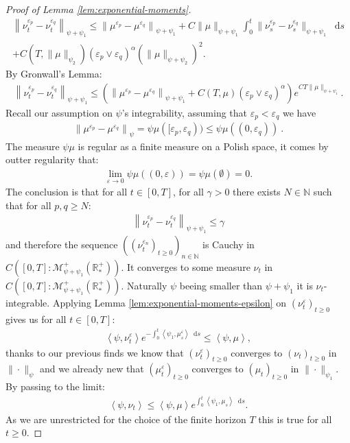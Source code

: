 \documentclass[11pt,a4paper]{article}
\newcommand{\NN}{\mathbb{N}}
\newcommand{\RRP}{\mathbb{R}^+_*}
\newcommand{\MC}{\mathcal{M}}
\newcommand{\Proc}[1]{\left(#1\right)_{t\geq 0}}
\newcommand{\Seq}[1]{\left(#1\right)_{n\in \mathbb{N}}}
\newcommand{\brac}[1]{\left\langle#1\right\rangle}
\newcommand{\dd}{\mathop{}\!\mathrm{d}}
\begin{document}
\begin{proof}[Proof of Lemma \ref{lem:exponential-moments}]
    \begin{multline*}
        \left\| \nu_t^{\varepsilon_p}-\nu_t^{\varepsilon_q}\right\|_{\psi + \psi_1} \leq  \left\| \mu^{\varepsilon_p} - \mu^{\varepsilon_q}\right\|_{\psi + \psi_1} + C\|\mu\|_{\psi + \psi_1}\int_0^t \|\nu_s^{\varepsilon_p}-\nu_s^{\varepsilon_q}\|_{\psi + \psi_1}\dd s \\
        + C\left(T,\|\mu\|_{\psi_2}\right)\left(\varepsilon_p \vee \varepsilon_q \right)^{\alpha} \left(\|\mu\|_{\psi + \psi_2}\right)^2.
    \end{multline*}
    By Gronwall's Lemma:
    \begin{align*}
        \left\| \nu_t^{\varepsilon_p}-\nu_t^{\varepsilon_q}\right\|_{\psi + \psi_1} \leq \left( \left\| \mu^{\varepsilon_p} - \mu^{\varepsilon_q}\right\|_{\psi + \psi_1} + C\left(T,\mu\right)\left(\varepsilon_p \vee \varepsilon_q \right)^{\alpha} \right) e^{CT\|\mu \|_{\psi + \psi_1}}.
    \end{align*}
    Recall our assumption on $\psi$'s integrability, assuming that $\varepsilon_p < \varepsilon_q$ we have
    \begin{align*}
        \left\| \mu^{\varepsilon_p} - \mu^{\varepsilon_q}\right\|_{\psi} = \psi\mu([\varepsilon_p,\varepsilon_q)) \leq \psi\mu\left((0,\varepsilon_q) \right)\ .
    \end{align*}
    The measure $\psi\mu$ is regular as a finite measure on a Polish space, it comes by outter regularity that:
    \begin{align*}
        \lim\limits_{\varepsilon \to 0} \psi\mu\left((0,\varepsilon)\right) = \psi\mu(\emptyset) = 0.
    \end{align*}
    The conclusion is that for all $t \in [0,T]$, for all $\gamma > 0$ there exists $N \in \NN$ such that for all $p,q \geq N$:
    \begin{align*}
        \left\| \nu_t^{\varepsilon_p}-\nu_t^{\varepsilon_q}\right\|_{\psi + \psi_1} \leq \gamma
    \end{align*}
    and therefore the sequence $\Seq{\Proc{\nu^{\varepsilon_n}_t}}$ is Cauchy in $C([0,T]:\MC^+_{\psi + \psi_1}(\RRP))$. It converges to some measure $\nu_t$ in $C([0,T]:\MC^+_{\psi + \psi_1}(\RRP))$. Naturally $\psi$ beeing smaller than $\psi + \psi_1$ it is $\nu_t$-integrable. Applying Lemma \ref{lem:exponential-moments-epsilon} on $\Proc{\nu^\varepsilon_t}$ gives us for all $t \in [0,T]$:
    \begin{align*}
        \brac{\psi,\nu^\varepsilon_t}e^{-\int_0^t \brac{\psi_1,\mu^\varepsilon_s}\dd s} \leq \brac{\psi,\mu},
    \end{align*}
    thanks to our previous finds we know that $\Proc{\nu_t^\varepsilon}$ converges to $\Proc{\nu_t}$ in $\|\cdot\|_{\psi}$ and we already new that $\Proc{\mu^\varepsilon_t}$ converges to $\Proc{\mu_t}$ in $\|\cdot\|_{\psi_1}$. By passing to the limit:
    \begin{align*}
        \brac{\psi,\nu_t} \leq  \brac{\psi,\mu} e^{\int_0^t \brac{\psi_1,\mu_s}\dd s}.
    \end{align*}
    As we are unrestricted for the choice of the finite horizon $T$ this is true for all $t \geq 0$. 
    

\end{proof}
\end{document}
